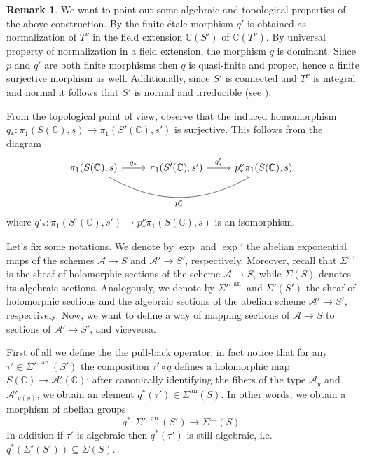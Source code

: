 \documentclass[10 pt,a4paper]{article}
\theoremstyle{plain}
\theoremstyle{definition}
\newtheorem{rem}[thm]{Remark}
\theoremstyle{named}
\newcommand{\cA}{\mathcal A}
\newcommand{\bC}{\mathbb C}
\DeclareMathOperator{\an}{an}
\begin{document}
\begin{rem}\label{algTopPropConstr}
    We want to point out some algebraic and topological properties of the above construction. By \cite[Exposé I, Corollaire~10.2]{SGA1} the finite étale morphism $q'$ is obtained as normalization of $T^\nu$ in the field extension $\bC(S')$ of $\bC(T^\nu)$. By universal property of normalization in a field extension, the morphism $q$ is dominant. Since $p$ and $q'$ are both finite morphisms then $q$ is quasi-finite and proper, hence a finite surjective morphism as well. Additionally, since $S'$ is connected and $T^\nu$ is integral and normal it follows that $S'$ is normal and irreducible (see \cite[Tag 0BQL]{stacks-project}).

    From the topological point of view, observe that the induced homomorphism $q_*:\pi_1(S(\bC),s) \to \pi_1(S'(\bC),s')$ is surjective. This follows from the diagram
    \begin{equation}
    \begin{tikzcd}
	   \pi_1(S(\bC),s) \arrow{r}{q_*} \arrow[bend right, swap]{rr}{p^\nu_*}& \pi_1(S'(\bC),s') \arrow{r}{q'_*} & p^\nu_*\pi_1(S(\bC),s),
    \end{tikzcd}
    \end{equation}
    where $q'_*:\pi_1(S'(\bC),s') \to p^\nu_*\pi_1(S(\bC),s)$ is an isomorphism.
\end{rem}

Let's fix some notations. We denote by $\exp$ and $\exp'$ the abelian exponential maps of the schemes $\cA \to S$ and $\cA' \to S'$, respectively. Moreover, recall that $\Sigma^{\an}$ is the sheaf of holomorphic sections of the scheme $\cA \to S$, while $\Sigma(S)$ denotes its algebraic sections. Analogously, we denote by $\Sigma'^{,\an}$ and $\Sigma'(S')$ the sheaf of holomorphic sections and the algebraic sections of the abelian scheme $\cA' \to S'$, respectively. Now, we want to define a way of mapping sections of $\cA \to S$ to sections of $\cA'\to S'$, and viceversa.

First of all we define the the pull-back operator: in fact notice that for any $\tau' \in \Sigma'^{,\an}(S')$ the composition $\tau' \circ q$ defines a holomorphic map $S(\bC) \to \cA'(\bC)$; after canonically identifying the fibers of the type $\cA_y$ and $\cA'_{q(y)}$, we obtain an element $q^*(\tau') \in \Sigma^{\an}(S)$. In other words, we obtain a morphism of abelian groups
\[
q^*: \Sigma'^{,\an}(S') \to \Sigma^{\an}(S).
\]
In addition if $\tau'$ is algebraic then $q^*(\tau')$ is still algebraic, i.e. $q^*(\Sigma'(S'))\subseteq \Sigma(S)$.
\end{document}
